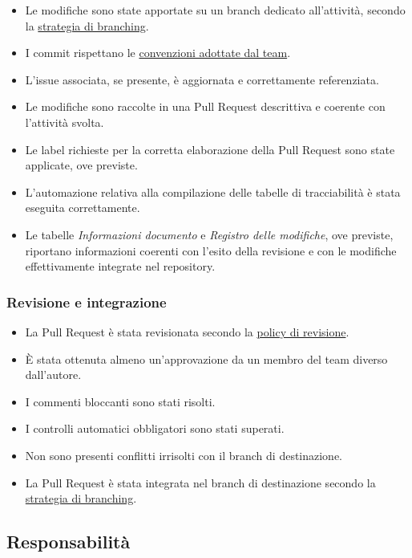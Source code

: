 \documentclass[11pt, a4paper]{article}
\begin{document}
\begin{itemize}
    \item Le modifiche sono state apportate su un branch dedicato all'attività, secondo la \hyperref[subsec:creazione-dei-branch]{strategia di branching}.
    \item I commit rispettano le \hyperref[sec:linee-guida-per-i-commit]{convenzioni adottate dal team}.
    \item L'issue associata, se presente, è aggiornata e correttamente referenziata.
    \item Le modifiche sono raccolte in una Pull Request descrittiva e coerente con l'attività svolta.
    \item Le label richieste per la corretta elaborazione della Pull Request sono state applicate, ove previste.
    \item L'automazione relativa alla compilazione delle tabelle di tracciabilità è stata eseguita correttamente.
    \item Le tabelle \textit{Informazioni documento} e \textit{Registro delle modifiche}, ove previste, riportano informazioni coerenti con l'esito della revisione e con le modifiche effettivamente integrate nel repository.
\end{itemize}

\subsubsection{Revisione e integrazione}

\begin{itemize}
    \item La Pull Request è stata revisionata secondo la \hyperref[subsec:approvazione-e-merge]{policy di revisione}.
    \item È stata ottenuta almeno un'approvazione da un membro del team diverso dall'autore.
    \item I commenti bloccanti sono stati risolti.
    \item I controlli automatici obbligatori sono stati superati.
    \item Non sono presenti conflitti irrisolti con il branch di destinazione.
    \item La Pull Request è stata integrata nel branch di destinazione secondo la \hyperref[sec:strategia-di-branching]{strategia di branching}.
\end{itemize}

\subsection{Responsabilità}
\end{document}

